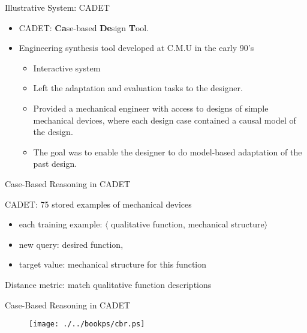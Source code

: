 \documentclass[%
pdf,
colorBG,
slideColor,
tcrico,
]{prosper}
\begin{document}

\begin{slide}{Illustrative System: CADET }


\begin{itemize}
 \item CADET: \textbf{Ca}se-based \textbf{De}sign \textbf{T}ool.
 \item Engineering synthesis tool developed at C.M.U in the early 90's
	\begin{itemize}
	 \item Interactive system 
	\item Left the adaptation and evaluation tasks to the designer. 
	\item Provided a mechanical engineer with access to designs of simple mechanical devices, where each design case contained a causal model of the design. 
	\item The goal was to enable the designer to do model-based adaptation of the past design.
	\end{itemize}
\end{itemize}
\end{slide}



\begin{slide}{Case-Based Reasoning in CADET }

CADET: 75 stored examples of mechanical devices

\begin{itemize}
\item each training example: $\langle$ qualitative function, mechanical structure$\rangle$
\item new query: desired function, 
\item target value: mechanical structure for this function
\end{itemize}

Distance metric: match qualitative function descriptions
\end{slide}



\begin{slide}{Case-Based Reasoning in CADET }
\begin{figure}
	\centering
	\texttt{[image: ./../bookps/cbr.ps]}
\end{figure}

\end{slide}
\end{document}
